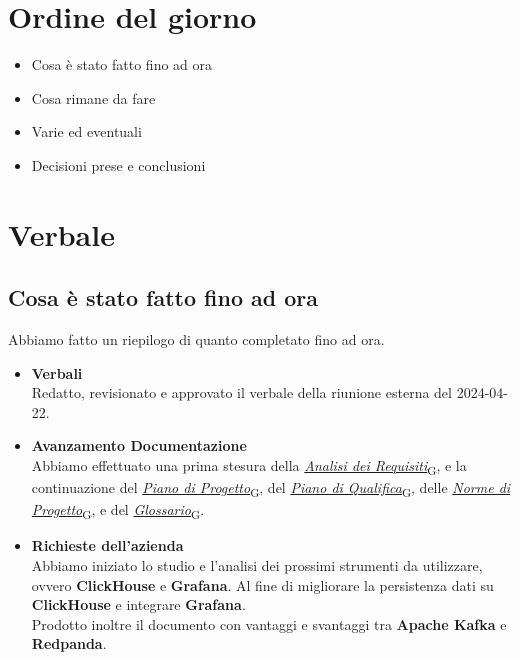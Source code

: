 \documentclass[italian,12pt]{article}
\begin{document}
\section{Ordine del giorno}
\begin{itemize}
	\item Cosa è stato fatto fino ad ora
	\item Cosa rimane da fare
	\item Varie ed eventuali
	\item Decisioni prese e conclusioni
\end{itemize}

\newpage

\section{Verbale}

\subsection{Cosa è stato fatto fino ad ora}
Abbiamo fatto un riepilogo di quanto completato fino ad ora.
\begin{itemize}
	\item \textbf{Verbali} \\
	Redatto, revisionato e approvato il verbale della riunione esterna del 2024-04-22.
	\item \textbf{Avanzamento Documentazione} \\
	Abbiamo effettuato una prima stesura della \href{https://7last.github.io/docs/rtb/documentazione-interna/glossario#analisi-dei-requisiti}{\textit{Analisi dei Requisiti}\textsubscript{G}}, e la continuazione del \href{https://7last.github.io/docs/rtb/documentazione-interna/glossario#piano-di-progetto}{\textit{Piano di Progetto}\textsubscript{G}}, del \href{https://7last.github.io/docs/rtb/documentazione-interna/glossario#piano-di-qualifica}{\textit{Piano di Qualifica}\textsubscript{G}}, delle \href{https://7last.github.io/docs/rtb/documentazione-interna/glossario#norme-di-progetto}{\textit{Norme di Progetto}\textsubscript{G}}, e del \href{https://7last.github.io/docs/rtb/documentazione-interna/glossario#glossario}{\textit{Glossario}\textsubscript{G}}.
	\item \textbf{Richieste dell'azienda} \\
	Abbiamo iniziato lo studio e l'analisi dei prossimi strumenti da utilizzare, ovvero \textbf{ClickHouse} e \textbf{Grafana}. Al fine di migliorare la persistenza dati su \textbf{ClickHouse} e integrare \textbf{Grafana}. \\
	Prodotto inoltre il documento con vantaggi e svantaggi tra \textbf{Apache Kafka} e \textbf{Redpanda}.
\end{itemize}
\end{document}
